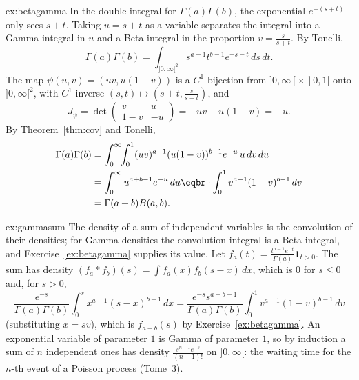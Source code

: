 \begin{solution}{ex:betagamma}
\idea In the double integral for $\Gamma(a)\Gamma(b)$, the exponential $e^{-(s+t)}$ only sees $s+t$. Taking $u=s+t$ as a variable separates the integral into a Gamma integral in $u$ and a Beta integral
in the proportion $v=\frac s{s+t}$.
\writeup By Tonelli,
\[\Gamma(a)\Gamma(b)=\int_{]0,\infty[^2}s^{a-1}t^{b-1}e^{-s-t}\,ds\,dt.\]
The map $\psi(u,v)=(uv,u(1-v))$ is a $C^1$ bijection from $]0,\infty[\times\,]0,1[$ onto $]0,\infty[^2$, with $C^1$ inverse
$(s,t)\mapsto(s+t,\frac s{s+t})$, and
\[J_\psi=\det\begin{pmatrix}v&u\\1-v&-u\end{pmatrix}=-uv-u(1-v)=-u.\]
By Theorem~\ref{thm:cov} and Tonelli,
\[\begin{aligned}\Gamma(a)\Gamma(b)&=\int_0^\infty\!\!\int_0^1(uv)^{a-1}(u(1-v))^{b-1}e^{-u}\,u\,dv\,du\\&=\int_0^\infty u^{a+b-1}e^{-u}\,du\eqbr\cdot\int_0^1v^{a-1}(1-v)^{b-1}\,dv\\&=\Gamma(a+b)B(a,b).\end{aligned}\]
\end{solution}

\begin{solution}{ex:gammasum}
\idea The density of a sum of independent variables is the convolution of their densities; for Gamma densities the convolution integral is a Beta integral, and Exercise~\ref{ex:betagamma}
supplies its value.
\writeup Let $f_a(t)=\frac{t^{a-1}e^{-t}}{\Gamma(a)}\mathbf 1_{t>0}$. The sum has density $(f_a*f_b)(s)=\int f_a(x)f_b(s-x)\,dx$, which is $0$ for $s\le0$ and, for $s>0$,
\[\frac{e^{-s}}{\Gamma(a)\Gamma(b)}\int_0^sx^{a-1}(s-x)^{b-1}\,dx=\frac{e^{-s}s^{a+b-1}}{\Gamma(a)\Gamma(b)}\int_0^1v^{a-1}(1-v)^{b-1}\,dv\]
(substituting $x=sv$), which is $f_{a+b}(s)$ by Exercise~\ref{ex:betagamma}. An exponential variable of parameter $1$ is Gamma of parameter $1$, so by induction a sum of $n$ independent ones has
density $\frac{s^{n-1}e^{-s}}{(n-1)!}$ on $]0,\infty[$: the waiting time for the $n$-th event of a Poisson process (Tome~3).
\end{solution}

